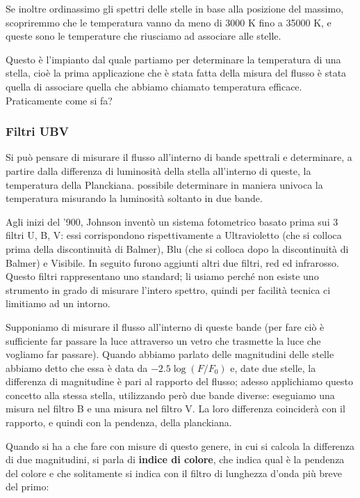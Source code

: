 Se inoltre ordinassimo gli spettri delle stelle in base alla posizione del massimo, scopriremmo che le temperatura vanno da meno di 3000 K fino a 35000 K, e queste sono le temperature che riusciamo ad associare alle stelle.

Questo è l'impianto dal quale partiamo per determinare la temperatura di una stella, cioè la prima applicazione che è stata fatta della misura del flusso è stata quella di associare quella che abbiamo chiamato temperatura efficace. Praticamente come si fa? 
 
\subsubsection{Filtri UBV}

Si può pensare di misurare il flusso all'interno di bande spettrali e determinare, a partire dalla differenza di luminosità della stella all'interno di queste, la temperatura della Planckiana. \E possibile determinare in maniera univoca la temperatura misurando la luminosità soltanto in due bande.

Agli inizi del '900, Johnson inventò un sistema fotometrico basato prima sui 3 filtri U, B, V: essi corrispondono rispettivamente a Ultravioletto (che si colloca prima della discontinuità di Balmer), Blu (che si colloca dopo la discontinuità di Balmer) e Visibile. In seguito furono aggiunti altri due filtri, red ed infrarosso. Questo filtri rappresentano uno standard; li usiamo perché non esiste uno strumento in grado di misurare l'intero spettro, quindi per facilità tecnica ci limitiamo ad un intorno.

Supponiamo di misurare il flusso all'interno di queste bande (per fare ciò è sufficiente far passare la luce attraverso un vetro che trasmette la luce che vogliamo far passare). Quando abbiamo parlato delle magnitudini delle stelle abbiamo detto che essa è data da $ -2.5 \log(F/F_0)$ e, date due stelle, la differenza di magnitudine è pari al rapporto del flusso; adesso applichiamo questo concetto alla stessa stella, utilizzando però due bande diverse: eseguiamo una misura nel filtro B e una misura nel filtro V. La loro differenza coinciderà con il rapporto, e quindi con la pendenza, della planckiana. 

Quando si ha a che fare con misure di questo genere, in cui si calcola la differenza di due magnitudini, si parla di \textbf{indice di colore}, che indica qual è la pendenza del colore e che solitamente si indica con il filtro di lunghezza d'onda più breve del primo:

